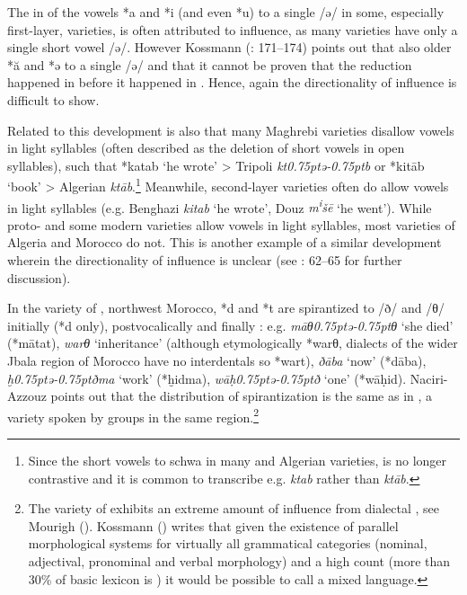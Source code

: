 \documentclass[output=paper]{langsci/langscibook}
\begin{document}
  The  in  of the vowels *{a} and *{i} (and even *{u}) to a single  /ǝ/ in some, especially first-layer, varieties, is often attributed to  influence, as many  varieties have only a single short vowel  /ǝ/. However Kossmann (\citeyear{Kossmann2013book}: 171–174) points out that  also  older *ă and *ǝ to a single  /ǝ/ and that it cannot be proven that the reduction happened in  before it happened in . Hence, again the directionality of influence is difficult to show.

  Related to this development is also that many Maghrebi varieties disallow vowels in light syllables (often described as the deletion of short vowels in open syllables), such that *katab ‘he wrote’ > Tripoli \textit{kt\kern 0.75ptǝ\kern -0.75ptb} or *kitāb ‘book’ > Algerian \textit{ktāb}.\footnote{Since the short vowels  to schwa in many  and Algerian varieties,  is no longer contrastive and it is common to transcribe e.g. \textit{ktab} rather than \textit{ktāb}.} Meanwhile, second-layer varieties often do allow vowels in light syllables (e.g. Benghazi \textit{kitab} ‘he wrote’, Douz \textit{m\textsuperscript{i}}\textit{šē} ‘he went’). While proto- and some modern varieties allow vowels in light syllables, most  varieties of Algeria and Morocco do not. This is another example of a similar development wherein the directionality of influence is unclear (see \citealt{Souag2017syllable}: 62–65 for further discussion).

  In the  variety of , northwest Morocco, *d and *t are spirantized to /ð/ and /θ/ initially (*d only), postvocalically and finally \citep{Naciri-Azzouz2016}: e.g. \textit{māθ\kern 0.75ptǝ\kern -0.75ptθ} `she died' (*mātat), \textit{warθ} `inheritance' (although etymologically *warθ, dialects of the wider Jbala region of Morocco have no interdentals so *wart), \textit{ðāba} `now' (*dāba), \textit{ḫ\kern 0.75ptǝ\kern -0.75ptðma} `work' (*ḫidma), \textit{wāḥ\kern 0.75ptǝ\kern -0.75ptð} `one' (*wāḥid). Naciri-Azzouz points out that the distribution of spirantization is the same as in  , a variety spoken by groups in the same region.\footnote{The  variety of  exhibits an extreme amount of influence from dialectal , see Mourigh (\citeyear{Mourigh2015}). Kossmann (\citeyear[431]{Kossmann2013book}) writes that given the existence of parallel morphological systems for virtually all grammatical categories (nominal, adjectival, pronominal and verbal morphology) and a high  count (more than 30\% of basic lexicon is ) it would be possible to call   a mixed language.}
\end{document}
